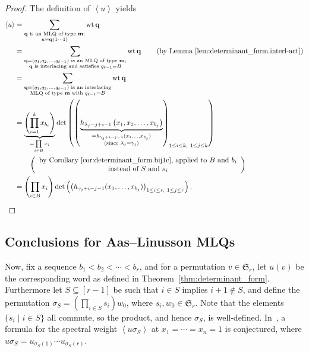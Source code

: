 \documentclass[reqno]{amsart}
\newcommand{\0}{\phantom{c}}
\newcommand{\swt}[1]{\left\langle #1 \right\rangle} %
\newcommand{\SymGp}[1]{\mathfrak{S}_{#1}} %
\let\sumnonlimits\sum
\let\prodnonlimits\prod
\renewcommand{\sum}{\sumnonlimits\limits}
\renewcommand{\prod}{\prodnonlimits\limits}
\newcommand{\ive}[1]{\left[ #1 \right]}
\theoremstyle{plain}
\theoremstyle{definition}
\numberwithin{equation}{section}
\begin{document}
\begin{proof}
The definition of $\left\langle u\right\rangle $ yields%
\begin{align*}
\left\langle u\right\rangle  &  =\sum_{\substack{\mathbf{q}\text{ is an MLQ of
type }\mathbf{m};\\u=\mathbf{q}\left(  1\cdots1\right)  }}\operatorname*{wt}%
\mathbf{q}\\
&  =\sum_{\substack{\mathbf{q}=\left(  q_{1},q_{2},\ldots,q_{\ell-1}\right)
\text{ is an MLQ of type }\mathbf{m};\\\mathbf{q}\text{ is interlacing and
satisfies }q_{\ell-1}=B}}\operatorname*{wt}\mathbf{q}\qquad\left(  \text{by
Lemma \ref{lem:determinant_form.interl-act}}\right) \\
&  =\sum_{\substack{\mathbf{q}=\left(  q_{1},q_{2},\ldots,q_{\ell-1}\right)
\text{ is an interlacing}\\\text{MLQ of type }\mathbf{m}\text{ with }%
q_{\ell-1}=B}}\operatorname*{wt}\mathbf{q}\\
&  =\underbrace{\left(  \prod_{i=1}^{k}x_{b_{i}}\right)  }_{=\prod_{i\in
B}x_{i}}\det\left(  \left(  \underbrace{h_{\lambda_{j}-j+i-1}\left(
x_{1},x_{2},\ldots,x_{b_{j}}\right)  }_{\substack{=h_{\gamma_{j}+i-j-1}%
(x_{1},\dotsc,x_{b_{j}})\\\text{(since }\lambda_{j}=\gamma_{j}\text{)}%
}}\right)  _{1\leq i\leq k,\ 1\leq j\leq k}\right) \\
&  \qquad\left(
\begin{array}
[c]{c}%
\text{by Corollary \ref{cor:determinant_form.bij1c}, applied to }B\text{ and
}b_{i}\\
\text{instead of }S\text{ and }s_{i}%
\end{array}
\right) \\
&  =\left(  \prod_{i\in B}x_{i}\right)  \det\left(  \left(  h_{\gamma
_{j}+i-j-1}(x_{1},\dotsc,x_{b_{j}})\right)  _{1\leq i\leq r,\ 1\leq j\leq
r}\right)  .
\end{align*}

\end{proof}

\subsection{Conclusions for Aas--Linusson MLQs}

Now, fix a sequence $b_1 < b_2 < \cdots < b_r$, and for a permutation $v \in \SymGp{r}$, let $u(v)$ be the corresponding word as defined in Theorem~\ref{thm:determinant_form}.
Furthermore let $S \subseteq \ive{r-1}$ be such that $i\in S$ implies $i+1 \notin S$, and define the permutation $\sigma_S = \left( \prod_{i \in S} s_i \right) w_0$, where $s_i, w_0 \in \SymGp{r}$.
Note that the elements $\{s_i \mid i \in S\}$ all commute, so the product, and hence $\sigma_S$, is well-defined.
In~\cite[Conj.~3.10]{AasLin17}, a formula for the spectral weight $\swt{u \sigma_S}$ at $x_1 = \cdots = x_n = 1$ is conjectured, where $u \sigma_S = u_{\sigma_S(1)} \cdots u_{\sigma_S(r)}$.
\end{document}
